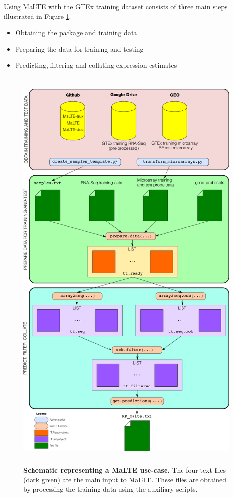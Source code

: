 \documentclass[a4paper,12pt]{article}
\begin{document}
Using \textsf{MaLTE} with the GTEx training dataset consists of three main steps illustrated in Figure \ref{fig:usecase}.

\begin{itemize}
\item Obtaining the package and training data
\item Preparing the data for training-and-testing
\item Predicting, filtering and collating expression estimates
\end{itemize}

\begin{figure}
\centering
\includegraphics[height=21cm]{schematic1.pdf}
\caption{\textbf{Schematic representing a \textsf{MaLTE} use-case.} The four text files (dark green) are the main input to \textsf{MaLTE}. These files are obtained by processing the training data using the auxiliary scripts.}
\label{fig:usecase}
\end{figure}
\end{document}
